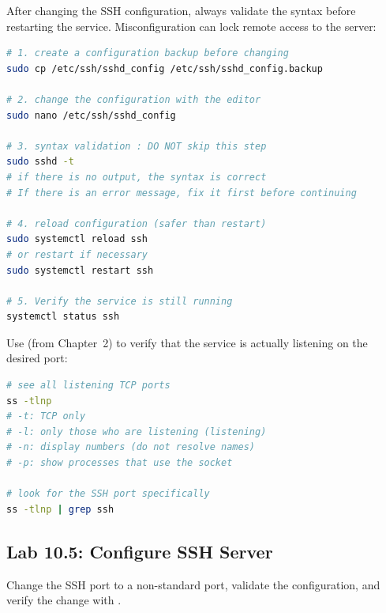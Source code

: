 After changing the SSH configuration, always validate the syntax before restarting the service. Misconfiguration can lock remote access to the server:

\begin{lstlisting}[language=bash, caption={The secure flow changes the SSH configuration}]
# 1. create a configuration backup before changing
sudo cp /etc/ssh/sshd_config /etc/ssh/sshd_config.backup

# 2. change the configuration with the editor
sudo nano /etc/ssh/sshd_config

# 3. syntax validation : DO NOT skip this step
sudo sshd -t
# if there is no output, the syntax is correct
# If there is an error message, fix it first before continuing

# 4. reload configuration (safer than restart)
sudo systemctl reload ssh
# or restart if necessary
sudo systemctl restart ssh

# 5. Verify the service is still running
systemctl status ssh
\end{lstlisting}

Use  (from Chapter~2) to verify that the service is actually listening on the desired port:

\begin{lstlisting}[language=bash, caption={Verify port with ss}]
# see all listening TCP ports
ss -tlnp
# -t: TCP only
# -l: only those who are listening (listening)
# -n: display numbers (do not resolve names)
# -p: show processes that use the socket

# look for the SSH port specifically
ss -tlnp | grep ssh
\end{lstlisting}

\subsection*{Lab 10.5: Configure SSH Server}

Change the SSH port to a non-standard port, validate the configuration, and verify the change with .

